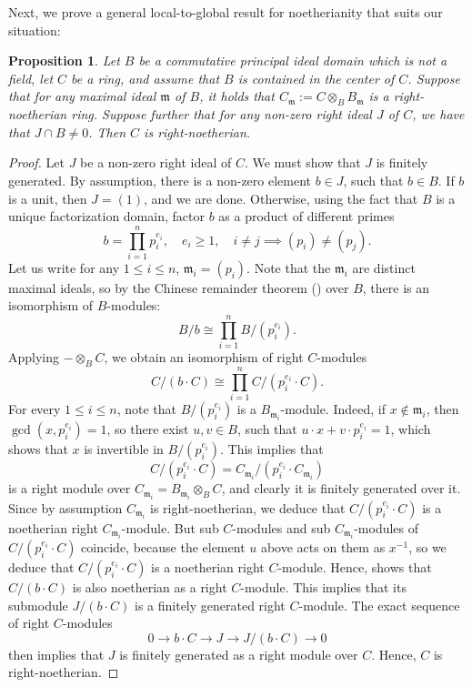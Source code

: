 \documentclass{amsart}
\newtheorem{prop}[equation]{Proposition}
\theoremstyle{definition}
\newcommand{\mfrak}[1]{\mathfrak{#1}}
\newcommand{\m}{\mfrak{m}}
\numberwithin{equation}{section}
\begin{document}
Next, we prove a general local-to-global result for noetherianity that suits our situation:
\begin{prop}\label{prop:local-to-global-noetherian}
Let $B$ be a commutative principal ideal domain which is not a field,
let $C$ be a ring, and assume that $B$ is contained in the center of $C$.
Suppose that for any maximal ideal $\m$ of $B$,
it holds that $C_{\m} := C\otimes_B B_{\m}$ is a right-noetherian ring.
Suppose further that for any non-zero right ideal $J$ of $C$,
we have that $J \cap B \ne 0$.
Then $C$ is right-noetherian.
\end{prop}
\begin{proof}
Let $J$ be a non-zero right ideal of $C$.
We must show that $J$ is finitely generated.
By assumption, there is a non-zero element $b \in J$,
such that $b \in B$.
If $b$ is a unit, then $J = (1)$, and we are done.
Otherwise, using the fact that $B$ is a unique factorization domain,
factor $b$ as a product of different primes
\[
b = \prod_{i=1}^n p_i^{e_i}, \quad e_i \ge 1, \quad i\ne j\implies (p_i) \ne (p_j).
\]
Let us write for any $1 \le i \le n$, $\m_i = (p_i)$.
Note that the $\m_i$ are distinct maximal ideals,
so by the Chinese remainder theorem (\cite[Proposition 1.10]{AM}) over $B$, there is an isomorphism of $B$-modules:
\[
B/b \cong \prod_{i=1}^n B/(p_i^{e_i}).
\]
Applying $-\otimes_B C$,
we obtain an isomorphism of right $C$-modules
\begin{equation}\label{eqn:Cmodb}
C/(b\cdot C) \cong \prod_{i=1}^n C/(p_i^{e_i} \cdot C).
\end{equation}
For every $1 \le i \le n$,
note that $B/(p_i^{e_i})$ is a $B_{\m_i}$-module.
Indeed, if $x \notin \m_i$, then $\gcd(x,p_i^{e_i}) = 1$,
so there exist $u, v \in B$,
such that $u\cdot x + v\cdot p_i^{e_i} = 1$,
which shows that $x$ is invertible in $B/(p_i^{e_i})$.
This implies that 
\[
C/(p_i^{e_i} \cdot C) = C_{\m_i}/(p_i^{e_i} \cdot C_{\m_i})
\]
is a right module over $C_{\m_i} = B_{\m_i}\otimes_B C$,
and clearly it is finitely generated over it.
Since by assumption $C_{\m_i}$ is right-noetherian,
we deduce that $C/(p_i^{e_i} \cdot C)$ is a noetherian right $C_{\m_i}$-module.
But sub $C$-modules and sub $C_{\m_i}$-modules of $C/(p_i^{e_i}\cdot C)$ coincide, because the element $u$ above acts on them as $x^{-1}$,
so we deduce that $C/(p_i^{e_i} \cdot C)$ is a noetherian right $C$-module.
Hence,  shows that $C/(b\cdot C)$ is also noetherian as a right $C$-module.
This implies that its submodule $J/(b\cdot C)$ is a finitely generated right $C$-module.
The exact sequence of right $C$-modules
\[
0 \to b\cdot C \to J \to J/(b\cdot C) \to 0
\]
then implies that $J$ is finitely generated as a right module over $C$.
Hence, $C$ is right-noetherian.
\end{proof}
\end{document}
